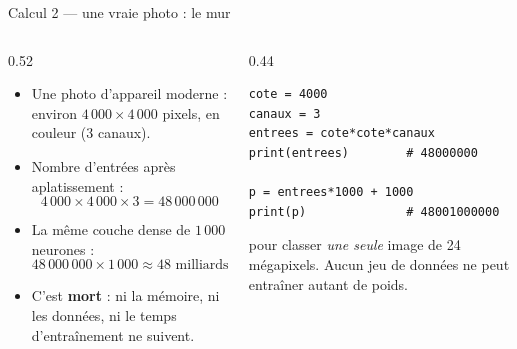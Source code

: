 \begin{frame}[fragile]{Calcul 2 --- une vraie photo : le mur}
\begin{columns}[t]
\begin{column}{0.52\textwidth}
\begin{itemize}
  \item Une photo d'appareil moderne : environ $4\,000 \times 4\,000$ pixels,
  en couleur (3 canaux).
  \item Nombre d'entrées après aplatissement :
  \[
  4\,000 \times 4\,000 \times 3 = 48\,000\,000
  \]
  \item La même couche dense de $1\,000$ neurones :
  \[
  48\,000\,000 \times 1\,000 \approx 48 \text{ milliards de paramètres}
  \]
  \item C'est \textbf{mort} : ni la mémoire, ni les données, ni le temps
  d'entraînement ne suivent.
\end{itemize}
\end{column}
\begin{column}{0.44\textwidth}
\begin{codebox}
\begin{lstlisting}
cote = 4000
canaux = 3
entrees = cote*cote*canaux
print(entrees)        # 48000000

p = entrees*1000 + 1000
print(p)              # 48001000000
\end{lstlisting}
\end{codebox}
\begin{wbox}
pour classer \emph{une seule} image de 24 mégapixels. Aucun jeu de données
ne peut entraîner autant de poids.
\end{wbox}
\end{column}
\end{columns}
\end{frame}

